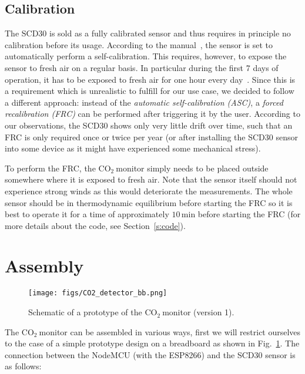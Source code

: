 \documentclass[12pt,a4paper]{article}
\newcommand{\coo}{\ensuremath{\mathrm{CO_2}~}}
\begin{document}
\subsection{Calibration}\label{s:SCD30calibration}
The SCD30 is sold as a fully calibrated sensor and thus requires in principle no calibration before its usage. According to the manual~\cite{SENSIRION2020C}, the sensor is set to automatically perform a self-calibration. This requires, however, to expose the sensor to fresh air on a regular basis. In particular during the first 7 days of operation, it has to be exposed to fresh air for one hour every day~\cite{SENSIRION2020C}. Since this is a requirement which is unrealistic to fulfill for our use case, we decided to follow a different approach: instead of the \textit{automatic self-calibration (ASC)}, a \textit{forced recalibration (FRC)} can be performed after triggering it by the user. According to our observations, the SCD30 shows only very little drift over time, such that an FRC is only required once or twice per year (or after installing the SCD30 sensor into some device as it might have experienced some mechanical stress). 

To perform the FRC, the \coo monitor simply needs to be placed outside somewhere where it is exposed to fresh air. Note that the sensor itself should not experience strong winds as this would deteriorate the measurements. The whole sensor should be in thermodynamic equilibrium before starting the FRC so it is best to operate it for a time of approximately $10\,\mathrm{min}$ before starting the FRC (for more details about the code, see Section~\ref{s:code}).


\section{Assembly}\label{s:assembly}
\begin{figure}[ht]
\center
\texttt{[image: figs/CO2\_detector\_bb.png]}
\caption{Schematic of a prototype of the \coo monitor (version 1).}
\label{f:CO2_fritzing}
\end{figure}
The \coo monitor can be assembled in various ways, first we will restrict ourselves to the case of a simple prototype design on a breadboard as shown in Fig.~\ref{f:CO2_fritzing}. The connection between the NodeMCU (with the ESP8266) and the SCD30 sensor is as follows:\\
\end{document}
